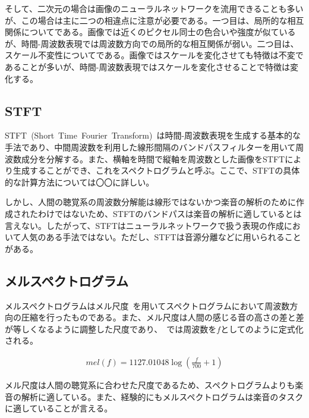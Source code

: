 そして、二次元の場合は画像のニューラルネットワークを流用できることも多いが、この場合は主に二つの相違点に注意が必要である。一つ目は、局所的な相互関係についてである。画像では近くのピクセル同士の色合いや強度が似ているが、時間-周波数表現では周波数方向での局所的な相互関係が弱い。二つ目は、スケール不変性についてである。画像ではスケールを変化させても特徴は不変であることが多いが、時間-周波数表現ではスケールを変化させることで特徴は変化する。

\clearpage

\subsection{STFT}

STFT~(Short~Time~Fourier~Transform)~は時間-周波数表現を生成する基本的な手法であり、中間周波数を利用した線形間隔のバンドパスフィルターを用いて周波数成分を分解する。また、横軸を時間で縦軸を周波数とした画像をSTFTにより生成することができ、これをスペクトログラムと呼ぶ。ここで、STFTの具体的な計算方法については〇〇に詳しい。%

しかし、人間の聴覚系の周波数分解能は線形ではないかつ楽音の解析のために作成されたわけではないため、STFTのバンドパスは楽音の解析に適しているとは言えない。したがって、STFTはニューラルネットワークで扱う表現の作成において人気のある手法ではない。ただし、STFTは音源分離などに用いられることがある。%

\subsection{メルスペクトログラム}

メルスペクトログラムはメル尺度~\cite{melscale}を用いてスペクトログラムにおいて周波数方向の圧縮を行ったものである。また、メル尺度は人間の感じる音の高さの差と差が等しくなるように調整した尺度であり、~\cite{mel}では周波数を$f$としてのように定式化される。

\begin{align}
    \label{eq:mel}
    mel(f)=1127.01048\log{(\frac{f}{700}+1)}
\end{align}

メル尺度は人間の聴覚系に合わせた尺度であるため、スペクトログラムよりも楽音の解析に適している。また、経験的にもメルスペクトログラムは楽音のタスクに適していることが言える。%

